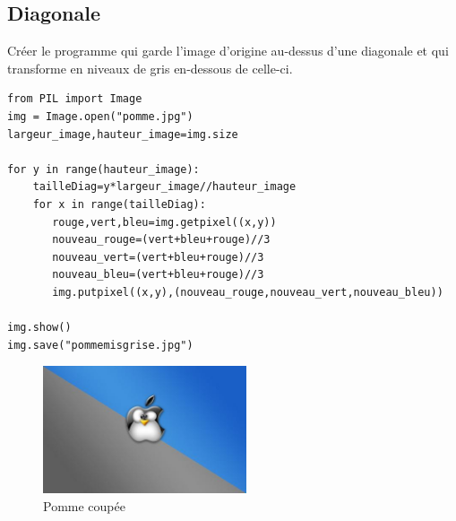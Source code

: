 \documentclass[11pt]{article}
\begin{document}
\subsection{Diagonale}
\label{sec:orgaa6dc4d}

Créer le programme qui garde l'image d'origine au-dessus d'une diagonale et qui transforme en niveaux de gris en-dessous de celle-ci.

\begin{verbatim}
from PIL import Image
img = Image.open("pomme.jpg")
largeur_image,hauteur_image=img.size

for y in range(hauteur_image):
    tailleDiag=y*largeur_image//hauteur_image
    for x in range(tailleDiag):
       rouge,vert,bleu=img.getpixel((x,y))
       nouveau_rouge=(vert+bleu+rouge)//3
       nouveau_vert=(vert+bleu+rouge)//3
       nouveau_bleu=(vert+bleu+rouge)//3
       img.putpixel((x,y),(nouveau_rouge,nouveau_vert,nouveau_bleu))

img.show()
img.save("pommemisgrise.jpg")
\end{verbatim}

\begin{figure}[htbp]
\centering
\includegraphics[width=6cm]{pommemisgrise.jpg}
\caption{Pomme coupée}
\end{figure}
\end{document}
